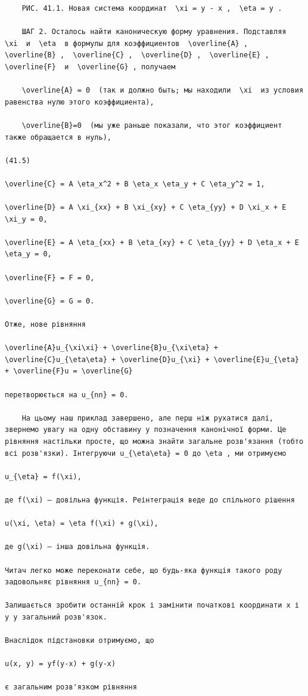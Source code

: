 \documentclass[
  ukrainian,
]{article}
\begin{document}
\begin{verbatim}
    РИС. 41.1. Новая система координат  \xi = y - x ,  \eta = y .

    ШАГ 2. Осталось найти каноническую форму уравнения. Подставляя  \xi  и  \eta  в формулы для коэффициентов  \overline{A} ,  \overline{B} ,  \overline{C} ,  \overline{D} ,  \overline{E} ,  \overline{F}  и  \overline{G} , получаем

    \overline{A} = 0  (так и должно быть; мы находили  \xi  из условия равенства нулю этого коэффициента),

    \overline{B}=0  (мы уже раньше показали, что этог коэффициент также обращается в нуль),

(41.5)

\overline{C} = A \eta_x^2 + B \eta_x \eta_y + C \eta_y^2 = 1,

\overline{D} = A \xi_{xx} + B \xi_{xy} + C \eta_{yy} + D \xi_x + E \xi_y = 0,

\overline{E} = A \eta_{xx} + B \eta_{xy} + C \eta_{yy} + D \eta_x + E \eta_y = 0,

\overline{F} = F = 0,

\overline{G} = G = 0.

Отже, нове рівняння

\overline{A}u_{\xi\xi} + \overline{B}u_{\xi\eta} + \overline{C}u_{\eta\eta} + \overline{D}u_{\xi} + \overline{E}u_{\eta} + \overline{F}u = \overline{G}

перетворюється на u_{nn} = 0.

    На цьому наш приклад завершено, але перш ніж рухатися далі, звернемо увагу на одну обставину у позначення канонічної форми. Це рівняння настільки просте, що можна знайти загальне розв'язання (тобто всі розв'язки). Інтегруючи u_{\eta\eta} = 0 до \eta , ми отримуємо

u_{\eta} = f(\xi),

де f(\xi) — довільна функція. Реінтеграція веде до спільного рішення

u(\xi, \eta) = \eta f(\xi) + g(\xi),

де g(\xi) — інша довільна функція.

Читач легко може переконати себе, що будь-яка функція такого роду задовольняє рівняння u_{nn} = 0.

Залишається зробити останній крок і замінити початкові координати x і y у загальний розв'язок.

Внаслідок підстановки отримуємо, що

u(x, y) = yf(y-x) + g(y-x)

є загальним розв'язком рівняння


\end{verbatim}
\end{document}
